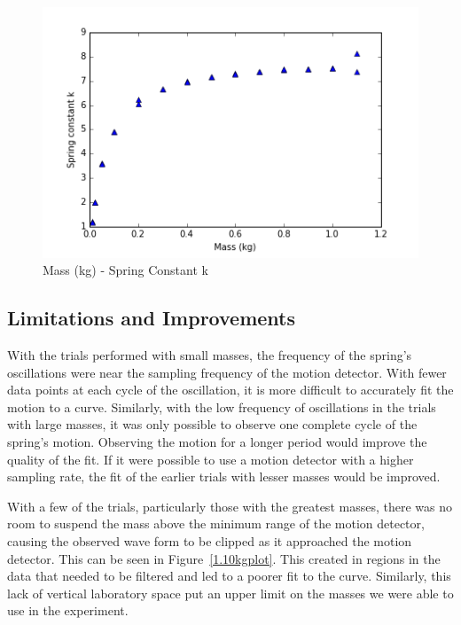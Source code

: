 \documentclass{article}
\numberwithin{figure}{section}
\numberwithin{table}{section}
\begin{document}
\begin{figure}[!hbp]
    \centering
    \includegraphics[width=\textwidth]{data/mass-v-k.png}
    \caption{Mass (kg) - Spring Constant k} 
    \label{mkplot}
\end{figure} 

\subsection{Limitations and Improvements} 

With the trials performed with small masses, the frequency of the spring's oscillations were near the sampling frequency of the motion detector.  With fewer data points at each cycle of the oscillation, it is more difficult to accurately fit the motion to a curve.  Similarly, with the low frequency of oscillations in the trials with large masses, it was only possible to observe one complete cycle of the spring's motion.  Observing the motion for a longer period would improve the quality of the fit.  If it were possible to use a motion detector with a higher sampling rate, the fit of the earlier trials with lesser masses would be improved. 

With a few of the trials, particularly those with the greatest masses, there was no room to suspend the mass above the minimum range of the motion detector, causing the observed wave form to be clipped as it approached the motion detector.  This can be seen in Figure~\ref{1.10kgplot}.  This created in regions in the data that needed to be filtered and led to a poorer fit to the curve.  Similarly, this lack of vertical laboratory space put an upper limit on the masses we were able to use in the experiment.
\end{document}
